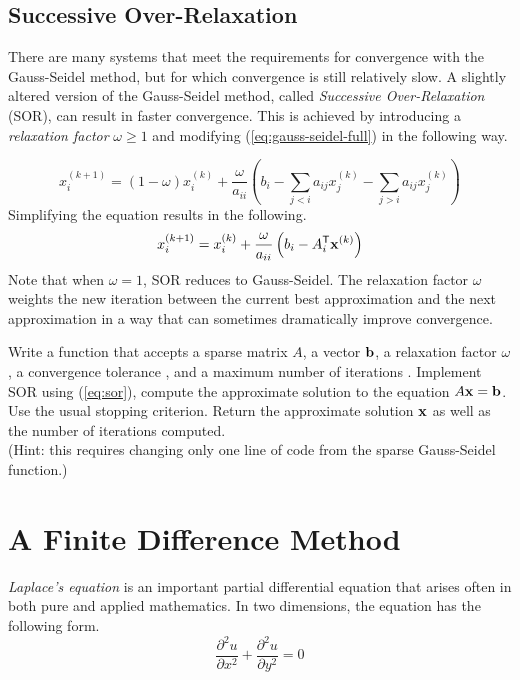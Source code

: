 \subsection*{Successive Over-Relaxation} %

There are many systems that meet the requirements for convergence with the Gauss-Seidel method, but for which convergence is still relatively slow.
A slightly altered version of the Gauss-Seidel method, called \emph{Successive Over-Relaxation} (SOR), can result in faster convergence.
This is achieved by introducing a \emph{relaxation factor} $\omega \ge 1$ and modifying (\ref{eq:gauss-seidel-full}) in the following way.

\[
x^{(k+1)}_i = (1-\omega)x^{(k)}_i + \frac{\omega}{a_{ii}} \left(b_i - \sum_{j < i}a_{ij}x^{(k)}_j - \sum_{j > i}a_{ij}x^{(k)}_j \right)
\]
Simplifying the equation results in the following.
\begin{equation}
x^{(k+1)}_i = x^{(k)}_i + \frac{\omega}{a_{ii}}\left( b_i - A_i^{\mathsf T}\mathbf{x}^{(k)}\right)
\label{eq:sor}
\end{equation}
Note that when $\omega = 1$, SOR reduces to Gauss-Seidel.
The relaxation factor $\omega$ weights the new iteration between the current best approximation and the next approximation in a way that can sometimes dramatically improve convergence.

\begin{problem} %
Write a function that accepts a sparse matrix $A$, a vector $\mathbf{b}$, a relaxation factor $\omega$, a convergence tolerance , and a maximum number of iterations .
Implement SOR using (\ref{eq:sor}), compute the approximate solution to the equation $A\mathbf{x} = \mathbf{b}$.
Use the usual stopping criterion.
Return the approximate solution $\mathbf{x}$ as well as the number of iterations computed.
\\ (Hint: this requires changing only one line of code from the sparse Gauss-Seidel function.)
\label{prob:sor}
\end{problem}

\section*{A Finite Difference Method} %

\emph{Laplace's equation} is an important partial differential equation that arises often in both pure and applied mathematics.
In two dimensions, the equation has the following form.
\begin{equation}
\frac{\partial^2 u}{\partial x^2} + \frac{\partial^2 u}{\partial y^2} = 0
\label{eq:laplaces-equation}
\end{equation}

